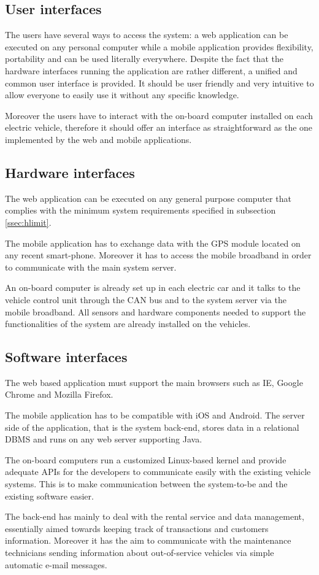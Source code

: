 \subsection{User interfaces}
The users have several ways to access the system: a web application can be executed on any personal computer while a mobile application provides flexibility, portability and can be used literally everywhere. Despite the fact that the hardware interfaces running the application are rather different, a unified and common user interface is provided. It should be user friendly and very intuitive to allow everyone to easily use it without any specific knowledge.

Moreover the users have to interact with the on-board computer installed on each electric vehicle, therefore it should offer an interface as straightforward as the one implemented by the web and mobile applications.

\subsection{Hardware interfaces} \label{hw_int}
The web application can be executed on any general purpose computer that complies with the minimum system requirements specified in subsection \ref{ssec:hlimit}.

The mobile application has to exchange data with the GPS module located on any recent smart-phone. Moreover it has to access the mobile broadband in order to communicate with the main system server.

An on-board computer is already set up in each electric car and it talks to the vehicle control unit through the CAN bus and to the system server via the mobile broadband. All sensors and hardware components needed to support the functionalities of the system are already installed on the vehicles.

\subsection{Software interfaces}
The web based application must support the main browsers such as IE, Google Chrome and Mozilla Firefox.

The mobile application has to be compatible with iOS and Android. The server side of the application, that is the system back-end, stores data in a relational DBMS and runs on any web server supporting Java.

The on-board computers run a customized Linux-based kernel and provide adequate APIs for the developers to communicate easily with the existing vehicle systems. This is to make communication between the system-to-be and the existing software easier.

The back-end has mainly to deal with the rental service and data management, essentially aimed towards keeping track of transactions and customers information. Moreover it has the aim to communicate with the maintenance technicians sending information about out-of-service vehicles via simple automatic e-mail messages.